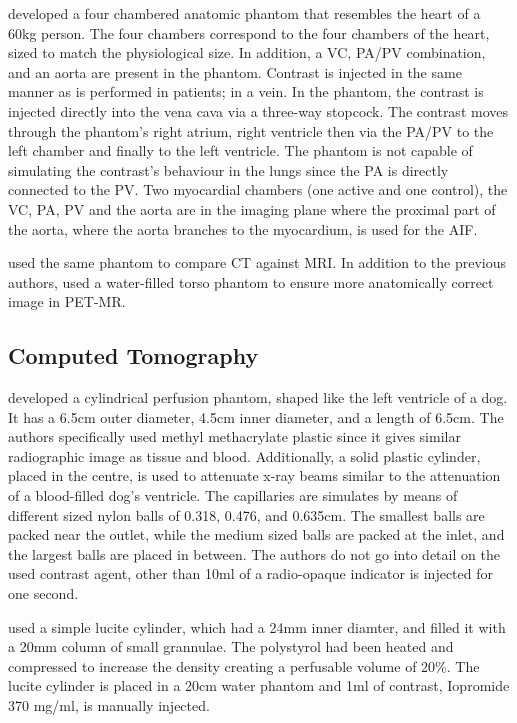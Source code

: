 \cite{chiribiri2013perfusion} developed a four chambered anatomic phantom that resembles the heart of a 60kg person. The four chambers correspond to the four chambers of the heart, sized to match the physiological size. In addition, a \ac{VC}, \ac{PA}/\ac{PV} combination, and an aorta are present in the phantom. Contrast is injected in the same manner as is performed in patients; in a vein. In the phantom, the contrast is injected directly into the vena cava via a three-way stopcock. The contrast moves through the phantom's right atrium, right ventricle then via the \ac{PA}/\ac{PV} to the left chamber and finally to the left ventricle. The phantom is not capable of simulating the contrast's behaviour in the lungs since the \ac{PA} is directly connected to the \ac{PV}. Two myocardial chambers (one active and one control), the \ac{VC}, \ac{PA}, \ac{PV} and the aorta are in the imaging plane where the proximal part of the aorta, where the aorta branches to the myocardium, is used for the \ac{AIF}. 

\cite{otton2013direct} used the same phantom to compare \ac{CT} against \ac{MRI}. In addition to the previous authors, \cite{o2017effect} used a water-filled torso phantom to ensure more anatomically correct image in \ac{PET-MR}.

\subsection{Computed Tomography}
\cite{teslow1991x} developed a cylindrical perfusion phantom, shaped like the left ventricle of a dog. It has a 6.5cm outer diameter, 4.5cm inner diameter, and a length of 6.5cm. The authors specifically used methyl methacrylate plastic since it gives similar radiographic image as tissue and blood. Additionally, a solid plastic cylinder, placed in the centre, is used to attenuate x-ray beams similar to the attenuation of a blood-filled dog's ventricle. The capillaries are simulates by means of different sized nylon balls of 0.318, 0.476, and 0.635cm. The smallest balls are packed near the outlet, while the medium sized balls are packed at the inlet, and the largest balls are placed in between. The authors do not go into detail on the used contrast agent, other than  10ml of a radio-opaque indicator is injected for one second.

\cite{klotz1999perfusion} used a simple lucite cylinder, which had a 24mm inner diamter, and filled it with a 20mm column of small grannulae. The polystyrol had been heated and compressed to increase the density creating a perfusable volume of 20\%. The lucite cylinder is placed in a 20cm water phantom and 1ml of contrast, Iopromide 370 mg/ml, is manually injected.


